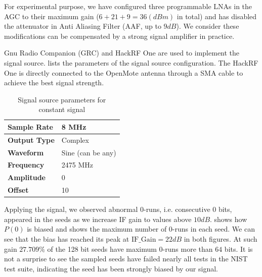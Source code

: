 For experimental purpose, we have configured three programmable LNAs in the AGC to their maximum gain ($6 + 21 + 9 = 36(dBm)$ in total) and has disabled the attenuator in Anti Aliasing Filter (AAF, up to $9dB$). We consider these modifications can be compensated by a strong signal amplifier in practice.

Gnu Radio Companion (GRC)\cite{GRC} and HackRF One\cite{HackRFOne} are used to implement the signal source.  lists the parameters of the signal source configuration. The HackRF One is directly connected to the OpenMote antenna through a SMA cable to achieve the best signal strength.

\begin{table}[!t]
\caption{Signal source parameters for constant signal}
\label{ConstantSignal}
\centering
\begin{tabular}{|l|l|}
\hline
\textbf{Sample Rate} & 8 MHz             \\ \hline
\textbf{Output Type} & Complex           \\ \hline
\textbf{Waveform}    & Sine (can be any) \\ \hline
\textbf{Frequency}   & 2475 MHz          \\ \hline
\textbf{Amplitude}   & 0                 \\ \hline
\textbf{Offset}      & 10                \\ \hline
\end{tabular}
\end{table}

Applying the signal, we observed abnormal 0-runs, i.e. consecutive $0$ bits, appeared in the seeds as we increase IF gain to values above $10dB$.  shows how $P(0)$ is biased and  shows the maximum number of 0-runs in each seed. We can see that the bias has reached its peak at $\text{IF\_Gain} = 22dB$ in both figures. At such gain $27.709\%$ of the 128 bit seeds have maximum 0-runs more than $64$ bits. It is not a surprise to see the sampled seeds have failed nearly all tests in the NIST test suite, indicating the seed has been strongly biased by our signal. 

